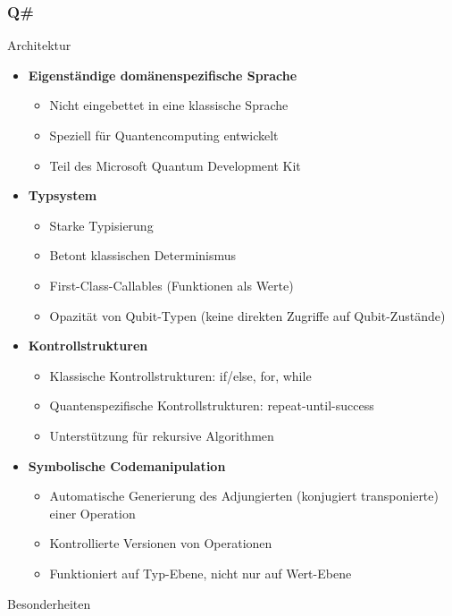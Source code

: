 \subsubsection{Q\#}
Architektur
\begin{itemize}
    \item \textbf{Eigenständige domänenspezifische Sprache}
    \begin{itemize}
        \item Nicht eingebettet in eine klassische Sprache
        \item Speziell für Quantencomputing entwickelt
        \item Teil des Microsoft Quantum Development Kit
    \end{itemize}
    
    \item \textbf{Typsystem}
    \begin{itemize}
        \item Starke Typisierung
        \item Betont klassischen Determinismus
        \item First-Class-Callables (Funktionen als Werte)
        \item Opazität von Qubit-Typen (keine direkten Zugriffe auf Qubit-Zustände)
    \end{itemize}
    
    \item \textbf{Kontrollstrukturen}
    \begin{itemize}
        \item Klassische Kontrollstrukturen: if/else, for, while
        \item Quantenspezifische Kontrollstrukturen: repeat-until-success
        \item Unterstützung für rekursive Algorithmen
    \end{itemize}
    
    \item \textbf{Symbolische Codemanipulation}
    \begin{itemize}
        \item Automatische Generierung des Adjungierten (konjugiert transponierte) einer Operation
        \item Kontrollierte Versionen von Operationen
        \item Funktioniert auf Typ-Ebene, nicht nur auf Wert-Ebene
    \end{itemize}
\end{itemize}
Besonderheiten
